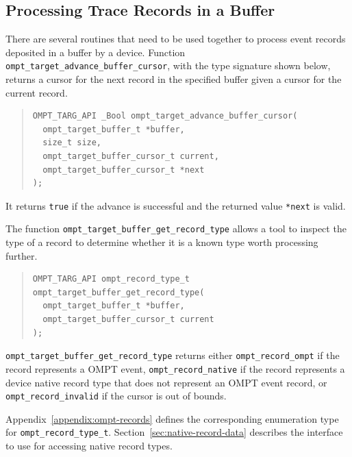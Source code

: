 \documentclass{article}
\begin{document}
\subsection{Processing Trace Records in a Buffer}
\label{sec:record-data}

There are several routines that need to be used together to process %
event records deposited in a buffer by a device. Function \lstinline|ompt_target_advance_buffer_cursor|, with the type signature shown below, returns a cursor for the next record in the specified buffer given a cursor for the current record.

\begin{quote}
\begin{lstlisting}
OMPT_TARG_API _Bool ompt_target_advance_buffer_cursor(
  ompt_target_buffer_t *buffer,
  size_t size, 
  ompt_target_buffer_cursor_t current, 
  ompt_target_buffer_cursor_t *next
); 
\end{lstlisting}
\end{quote}
It returns \lstinline|true| if the advance is successful and the returned value \lstinline|*next| is valid.

The function \lstinline|ompt_target_buffer_get_record_type| allows a tool to inspect the type of a record to determine whether it is a known type  worth processing further. 
\begin{quote}
\begin{lstlisting}
OMPT_TARG_API ompt_record_type_t ompt_target_buffer_get_record_type(
  ompt_target_buffer_t *buffer, 
  ompt_target_buffer_cursor_t current
);
\end{lstlisting}
\end{quote}
\sloppy
\lstinline|ompt_target_buffer_get_record_type| returns either \lstinline|ompt_record_ompt| if the record represents a OMPT event,  
\lstinline|ompt_record_native| if the record represents a device native record type that does not represent an OMPT event record, or \lstinline|ompt_record_invalid| if the cursor is out of bounds. 

Appendix~\ref{appendix:ompt-records} defines the corresponding enumeration type for \lstinline|ompt_record_type_t|. 
Section~\ref{sec:native-record-data} describes the interface to use for accessing native record types.
\end{document}
